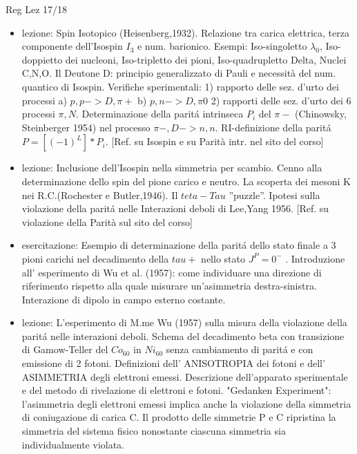 \begin{frame}[allowframebreaks]{Reg Lez 17/18}
\begin{itemize}
\item lezione: Spin Isotopico (Heisenberg,1932). Relazione tra carica elettrica, terza componente dell'Isospin $I_3$ e num. barionico. Esempi: Iso-singoletto $\lambda_0$, Iso-doppietto dei nucleoni, Iso-tripletto dei pioni, Iso-quadrupletto Delta, Nuclei C,N,O. Il Deutone D: principio generalizzato di Pauli e necessità del num. quantico di Isospin. Verifiche sperimentali: 1) rapporto delle sez. d'urto dei processi a) $p,p->D,\pi+$ b) $p,n->D,\pi0$ 2) rapporti delle sez. d'urto dei 6 processi $\pi,N$. Determinazione della parit\'a intrinseca $P_i$ del $\pi-$ (Chinowsky, Steinberger 1954) nel processo $\pi-,D->n,n$. RI-definizione della parit\'a $P=[(-1)^L]*P_i$. [Ref. su Isospin e su Parità intr. nel sito del corso]

\item lezione: Inclusione dell'Isospin nella simmetria per scambio. Cenno alla determinazione dello spin del pione carico e neutro. La scoperta dei mesoni K nei R.C.(Rochester e Butler,1946). Il $teta-Tau$ ''puzzle''. Ipotesi sulla violazione della parit\'a nelle Interazioni deboli di Lee,Yang 1956. [Ref. su violazione della Parità sul sito del corso]

\item esercitazione: Esempio di determinazione della parit\'a dello stato finale a 3 pioni carichi nel decadimento della $tau+$ nello stato $J^P=0^-$ . Introduzione all' esperimento di Wu et al. (1957): come individuare una direzione di riferimento rispetto alla quale misurare un'asimmetria destra-sinistra. Interazione di dipolo in campo esterno costante.

\item lezione: L'esperimento di M.me Wu (1957) sulla misura della violazione della parit\'a nelle interazioni deboli. Schema del decadimento beta con transizione di Gamow-Teller del $Co_{60}$ in $Ni_{60}$ senza cambiamento di parit\'a e con emissione di 2 fotoni. Definizioni dell' ANISOTROPIA dei fotoni e dell' ASIMMETRIA degli elettroni emessi. Descrizione dell'apparato sperimentale e del metodo di rivelazione di elettroni e fotoni. "Gedanken Experiment": l'asimmetria degli elettroni emessi implica anche la violazione della simmetria di coniugazione di carica C. Il prodotto delle simmetrie P e C ripristina la simmetria del sistema fisico nonostante ciascuna simmetria sia individualmente violata.


\end{itemize}
\end{frame}
